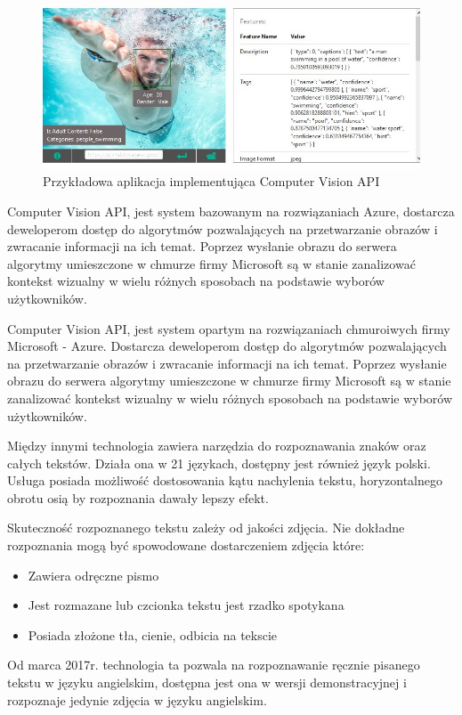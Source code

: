 \documentclass[brudnopis]{xmgr}
\begin{document}
\begin{figure}[!tbh]
\centering
\includegraphics[width=.8\hsize]{fig/mscvapi}
\caption{Przykładowa aplikacja implementująca Computer Vision API}
\end{figure}
\newpage

Computer Vision API, jest system bazowanym na rozwiązaniach Azure, dostarcza deweloperom dostęp do algorytmów pozwalających na przetwarzanie obrazów i zwracanie informacji na ich temat. Poprzez wysłanie obrazu do serwera algorytmy umieszczone w chmurze firmy Microsoft są w stanie zanalizować kontekst wizualny w wielu różnych sposobach na podstawie wyborów użytkowników.

Computer Vision API, jest system opartym na rozwiązaniach chmuroiwych firmy Microsoft - Azure. Dostarcza deweloperom dostęp do algorytmów pozwalających na przetwarzanie obrazów i zwracanie informacji na ich temat. Poprzez wysłanie obrazu do serwera algorytmy umieszczone w chmurze firmy Microsoft są w stanie zanalizować kontekst wizualny w wielu różnych sposobach na podstawie wyborów użytkowników.

Między innymi technologia zawiera narzędzia do rozpoznawania znaków oraz całych tekstów. Działa ona w 21 językach, dostępny jest również język polski. Usługa posiada możliwość dostosowania kątu nachylenia tekstu, horyzontalnego obrotu osią by rozpoznania dawały lepszy efekt. 

Skuteczność rozpoznanego tekstu zależy od jakości zdjęcia. Nie dokładne rozpoznania mogą być spowodowane dostarczeniem zdjęcia które:

\begin{itemize}
\item
Zawiera odręczne pismo
\item
Jest rozmazane lub czcionka tekstu jest rzadko spotykana
\item
Posiada złożone tła, cienie, odbicia na tekscie
\end{itemize}

Od marca 2017r. technologia ta pozwala na rozpoznawanie ręcznie pisanego tekstu w języku angielskim, dostępna jest ona w wersji demonstracyjnej i rozpoznaje jedynie zdjęcia w języku angielskim.
\end{document}
